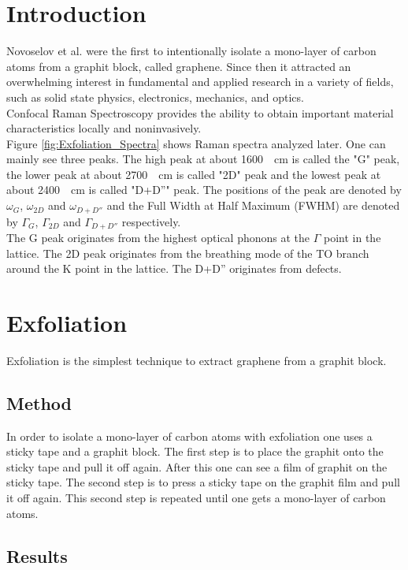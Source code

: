 \documentclass[%
 reprint,
amsmath,amssymb,
pra,
]{revtex4-1}
\begin{document}
\section{Introduction}
Novoselov et al. were the first to intentionally isolate a mono-layer of carbon atoms from a graphit block, called graphene.\citep{Novoselov2004} Since then it attracted an overwhelming interest in fundamental and applied research in a variety of fields, such as solid state physics, electronics, mechanics, and optics.\citep{NeumannStampfer} \\
Confocal Raman Spectroscopy provides the ability to obtain important material characteristics locally and noninvasively.\citep{NeumannStampfer} \\
Figure \ref{fig:Exfoliation_Spectra} shows Raman spectra analyzed later. One can mainly see three peaks. The high peak at about \SI{1600}{\per cm} is called the "G" peak, the lower peak at about \SI{2700}{\per cm} is called "2D" peak and the lowest peak at about \SI{2400}{\per cm} is called "D+D''" peak. The positions of the peak are denoted by $\omega _G$, $\omega _{2D}$ and $\omega _{D+D''}$ and the Full Width at Half Maximum (FWHM) are denoted by $\Gamma _G$, $\Gamma _{2D}$ and $\Gamma _{D+D''}$ respectively. \\
The G peak originates from the highest optical phonons at the $\Gamma$ point in the lattice. The 2D peak originates from the breathing mode of the TO branch around the K point in the lattice. The D+D'' originates from defects.\citep{NeumannStampfer}


\section{Exfoliation}
Exfoliation is the simplest technique to extract graphene from a graphit block.

\subsection{Method}
In order to isolate a mono-layer of carbon atoms with exfoliation one uses a sticky tape and a graphit block. The first step is to place the graphit onto the sticky tape and pull it off again. After this one can see a film of graphit on the sticky tape. The second step is to press a sticky tape on the graphit film and pull it off again. This second step is repeated until one gets a mono-layer of carbon atoms.

\subsection{Results}
\end{document}
